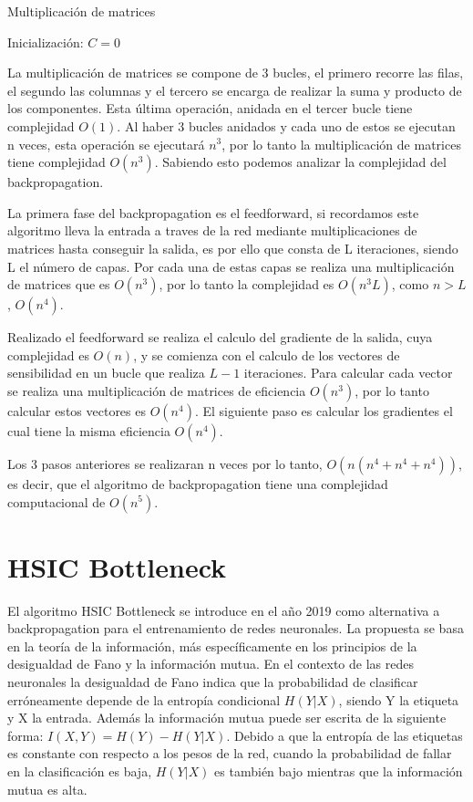 \begin{algorithm}
   \caption{Multiplicación de matrices}
   Inicialización: $C = 0$\\
\end{algorithm}

La multiplicación de matrices se compone de 3 bucles, el primero recorre las filas, el segundo las columnas y el tercero se encarga de realizar la suma y producto de los componentes. Esta última operación, anidada en el tercer bucle tiene complejidad $O(1)$. Al haber 3 bucles anidados y cada uno de estos se ejecutan n veces, esta operación se ejecutará $n^{3}$, por lo tanto la multiplicación de matrices tiene complejidad $O(n^3)$. Sabiendo esto podemos analizar la complejidad del backpropagation.

 La primera fase del backpropagation es el feedforward, si recordamos este algoritmo lleva la entrada a traves de la red mediante multiplicaciones de matrices hasta conseguir la salida, es por ello que consta de L iteraciones, siendo L el número de capas. Por cada una de estas capas se realiza una multiplicación de matrices que es $O(n^3)$, por lo tanto la complejidad es $O(n^3L)$, como $n>L$, $O(n^4)$.

Realizado el feedforward se realiza el calculo del gradiente de la salida, cuya complejidad es $O(n)$, y se comienza con el calculo de los vectores de sensibilidad en un bucle que realiza $L-1$ iteraciones. Para calcular cada vector se realiza una multiplicación de matrices de eficiencia $O(n^3)$, por lo tanto calcular estos vectores es $O(n^4)$. El siguiente paso es calcular los gradientes el cual tiene la misma eficiencia $O(n^4)$. 

Los 3 pasos anteriores se realizaran n veces por lo tanto, $O(n(n^4+n^4+n^4))$, es decir, que el algoritmo de backpropagation tiene una complejidad computacional de $O(n^5)$.

\section{HSIC Bottleneck}

El algoritmo HSIC Bottleneck se introduce en el año 2019 como alternativa a backpropagation para el entrenamiento de redes neuronales. La propuesta se basa en la teoría de la información, más específicamente en los principios de la desigualdad de Fano y la información mutua. En el contexto de las redes neuronales la desigualdad de Fano indica que la probabilidad de clasificar erróneamente depende de la entropía condicional $H(Y|X)$, siendo Y la etiqueta y X la entrada. Además la información mutua puede ser escrita de la siguiente forma: $I(X,Y) = H(Y) - H(Y|X)$. Debido a que la entropía de las etiquetas es constante con respecto a los pesos de la red, cuando la probabilidad de fallar en la clasificación es baja, $H(Y|X)$ es también bajo mientras que la información mutua es alta. 

